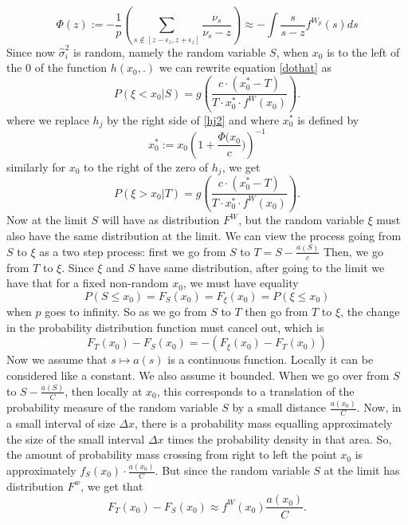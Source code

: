 \documentclass[12pt]{amsart}
\theoremstyle{definition}
\numberwithin{equation}{section}
\numberwithin{equation}{section}
\theoremstyle{remark}
\numberwithin{equation}{section}
\begin{document}
$$\Phi(z):=-\frac{1}{p}\left(\sum_{s\notin [z-\epsilon_z,z+\epsilon_z]}\frac{\nu_s}{\nu_s-z}\right)\approx -\int \frac{s}{s-z}f^{W_p}(s)ds$$
 Since now $\hat{\sigma}^2_i$ is random, namely the random variable $S$,
 when $x_0$ is to the left of the $0$ of the function $h(x_0,.)$ we can rewrite equation \ref{dothat}
 as
 \begin{equation}
 \label{dotha2}
 P(\xi<x_0|S)=g\left(\frac{c\cdot (x_0^*-T)}{T\cdot x_0^*\cdot f^W(x_0)}\right).
 \end{equation}
where we replace $h_j$ by the right side of \ref{hj2} and where
$x_0^*$ is defined by
$$x_0^*:=x_0\left(1+\frac{\Phi(x_0}{c})\right)^{-1}$$
similarly for $x_0$ to the right of the zero of $h_j$, we get
\begin{equation}
\label{dotha3}
P(\xi>x_0|T)=g\left(\frac{c\cdot (x_0^*-T)}{T\cdot x_0^*\cdot f^W(x_0)}\right).
\end{equation}
Now at the limit $S$ will have as distribution $F^W$, but the random variable $\xi$ must also have the same distribution at the limit. We can view the process going from $S$ to $\xi$ as a two step
process: first we go from $S$ to $T=S-\frac{a(S)}{c}$ Then, we go from $T$ to $\xi$.
Since $\xi$ and $S$ have same distribution, after going to the limit we have that for a fixed
non-random $x_0$, we must
have equality
$$P(S\leq x_0)=F_S(x_0)=F_\xi(x_0)=P(\xi\leq x_0)$$
when $p$ goes to infinity. So as we go from $S$ to $T$ then go from $T$ to $\xi$, the change in the probability distribution function must cancel out, which is
\begin{equation}
\label{step_zero}
F_T(x_0)-F_S(x_0)=-(F_\xi(x_0)-F_T(x_0))
\end{equation}
Now we assume that $s\mapsto a(s)$ is a continuous function.
Locally it can be considered like a constant. We also assume
it bounded. When we go over from $S$ to $S-\frac{a(S)}{C}$, then locally at $x_0$, this corresponds to a translation of the probability measure of the random variable $S$ by a small distance $\frac{a(x_0)}{C}$. Now, in a small interval of size $\Delta x$,  there is a probability mass equalling approximately the size of the small interval $\Delta x$ times the probability density in that area. So, the amount of probability mass crossing from right to left the point $x_0$ is approximately $f_S(x_0)\cdot \frac{a(x_0)}{C}$. But since the random variable $S$ at the limit has distribution
$F^w$, we get that
\begin{equation}
\label{first_step}
F_T(x_0)-F_S(x_0)\approx f^W(x_0)\frac{a(x_0)}{C}.
\end{equation}
\end{document}
